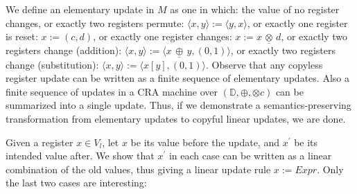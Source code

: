 \documentclass[11pt]{article}
\newcommand{\domain}{\ensuremath{\mathbb{D}}}
\newcommand{\sradd}{\oplus}
\newcommand{\srmul}{\otimes}
\def\myplus{\otimes}
\def\mytimes{\oplus}
\def\dadd{\,\underline\mytimes\,}
\def\dscale{\,\underline\myplus\,}
\begin{document}
We define an elementary update in $M$ as one in which:
the value of no register changes, or
exactly two registers permute: $\langle x,y\rangle:=\langle y,x\rangle$, or
exactly one register is reset: $x:=\left(c,d\right)$, or
exactly one register changes: $x:=x\dscale d$, or
exactly two registers change (addition): $\langle x,y\rangle:=\langle x\dadd y,\left(0,1\right)\rangle$, or
exactly two registers change (substitution): $\langle x,y\rangle :=\langle x\left[y\right],\left(0,1\right)\rangle$.
Observe that any copyless register update can be written as a finite
sequence of elementary updates. Also a finite sequence of updates
in a CRA machine over $\left(\domain,\sradd,\srmul c\right)$ can be summarized into a single update. Thus,
if we demonstrate a semantics-preserving transformation from elementary
updates to copyful linear updates, we are done.

Given a register $x\in V_{l}$, let $x$ be its value before the update,
and $x^{\prime}$ be its intended value after. We show that $x^{\prime}$
in each case can be written as a linear combination of the old values,
thus giving a linear update rule $x:=Expr$. Only the last two cases are interesting:
\end{document}
